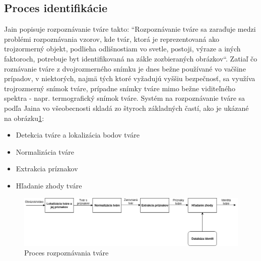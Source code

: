 \subsection{Proces identifikácie}
Jain popisuje rozpoznávanie tváre takto: ``Rozpoznávanie tváre sa zaraďuje medzi problémi rozpoznávania vzorov, kde tvár, ktorá je reprezentovaná ako trojzormerný objekt,
podlieha odlišnostiam vo svetle, postoji, výraze a iných faktoroch, potrebuje byt identifikovaná na zákle zozbieraných obrázkov``\cite{handbookface}.
Zatiaľ čo roznávanie tváre z dvojrozmerného snímku je dnes bežne používané vo vačšine prípadov, v niektorých, najmä tých ktoré vyžadujú vyššiu bezpečnosť,
sa využíva trojrozmerný snímok tváre,
prípadne snímky tváre mimo bežne viditeľného spektra - napr. termografický snímok tváre.  Systém na rozpoznávanie tváre sa podľa Jaina\cite{handbookface} vo všeobecnosti skladá zo štyroch
základných častí, ako je ukázané na obrázku\ref{fig:workflow}:
\begin{itemize}
    \item Detekcia tváre a lokalizácia bodov tváre
    \item Normalizácia tváre
    \item Extrakcia príznakov
    \item Hľadanie zhody tváre
\end{itemize}

\begin{figure}[H]
    \centering
    \includegraphics[width=1\linewidth]{img/workflow}
    \caption{Proces rozpoznávania tváre}
    \label{fig:workflow}
\end{figure}

